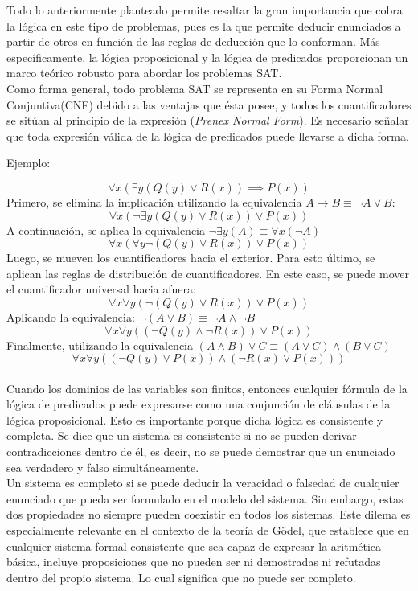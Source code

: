 \documentclass[12pt]{report}
\begin{document}
Todo lo anteriormente planteado permite resaltar la gran importancia que cobra la lógica en este tipo de problemas, pues es la que permite deducir enunciados a partir de otros en función de las reglas de deducción que lo conforman. Más específicamente, la lógica proposicional y la lógica de predicados proporcionan un marco teórico robusto para abordar los problemas SAT.\\

Como forma general, todo problema SAT se representa en su Forma Normal Conjuntiva(CNF) debido a las ventajas que ésta posee, y todos los cuantificadores se sitúan al principio de la expresión (\textit{Prenex Normal Form}). Es necesario señalar que toda expresión válida de la lógica de predicados puede llevarse a dicha forma.

Ejemplo:

$$\forall x(\exists y(Q(y)\lor R(x))\implies P(x))$$
Primero, se elimina la implicación utilizando la equivalencia $A→B\equiv \neg A\lor B$:
$$\forall x(\neg\exists y(Q(y)\lor R(x)) \lor  P(x))$$
A continuación, se aplica la equivalencia $\neg\exists y(A)\equiv \forall x(\neg A)$
$$\forall x(\forall y\neg(Q(y)\lor R(x)) \lor  P(x))$$
Luego, se mueven los cuantificadores hacia el exterior. Para esto último, se aplican las reglas de distribución de cuantificadores. En este caso, se puede mover el cuantificador universal hacia afuera:
$$\forall x\forall y(\neg(Q(y)\lor R(x))\lor  P(x))$$
Aplicando la equivalencia: $\neg(A\lor B)\equiv \neg A\land\neg B$
$$\forall x\forall y((\neg Q(y)\land\neg R(x))\lor  P(x))$$
Finalmente, utilizando la equivalencia $(A\land B)\lor C\equiv (A\lor C)\land(B\lor C)$
$$\forall x\forall y((\neg Q(y)\lor  P(x))\land(\neg R(x)\lor  P(x)))$$\\

Cuando los dominios de las variables son finitos, entonces cualquier fórmula de la lógica de predicados puede expresarse como una conjunción de cláusulas de la lógica proposicional. Esto es importante porque dicha lógica es consistente y completa. Se dice que un sistema es consistente si no se pueden derivar contradicciones dentro de él, es decir, no se puede demostrar que un enunciado sea verdadero y falso simultáneamente. \\

Un sistema es completo si se puede deducir la veracidad o falsedad de cualquier enunciado que pueda ser formulado en el modelo del sistema. Sin embargo, estas dos propiedades no siempre pueden coexistir en todos los sistemas. Este dilema es especialmente relevante en el contexto de la teoría de Gödel, que establece que en cualquier sistema formal consistente que sea capaz de expresar la aritmética básica, incluye proposiciones que no pueden ser ni demostradas ni refutadas dentro del propio sistema. Lo cual significa que no puede ser completo.\\
\end{document}
